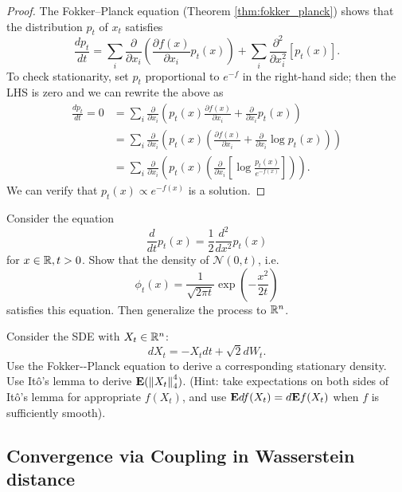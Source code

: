 \begin{proof}
The Fokker--Planck equation (Theorem \ref{thm:fokker_planck}) shows
that the distribution $p_{t}$ of $x_{t}$ satisfies 
\begin{equation}
\frac{dp_{t}}{dt}=\sum_{i}\frac{\partial}{\partial x_{i}}(\frac{\partial f(x)}{\partial x_{i}}p_{t}(x))+\sum_{i}\frac{\partial^{2}}{\partial x^{2}_{i}}\left[p_{t}(x)\right].\label{eq:dp_LD}
\end{equation}
To check stationarity, set $p_{t}$ proportional to $e^{-f}$ in the
right-hand side; then the LHS is zero and we can rewrite the above
as
\begin{align*}
\frac{dp_{t}}{dt}=0 & =\sum_{i}\frac{\partial}{\partial x_{i}}\left(p_{t}(x)\frac{\partial f(x)}{\partial x_{i}}+\frac{\partial}{\partial x_{i}}p_{t}(x)\right)\\
 & =\sum_{i}\frac{\partial}{\partial x_{i}}\left(p_{t}(x)\left(\frac{\partial f(x)}{\partial x_{i}}+\frac{\partial}{\partial x_{i}}\log p_{t}(x)\right)\right)\\
 & =\sum_{i}\frac{\partial}{\partial x_{i}}\left(p_{t}(x)\left(\frac{\partial}{\partial x_{i}}\left[\log\frac{p_{t}(x)}{e^{-f(x)}}\right]\right)\right).
\end{align*}
We can verify that $p_{t}(x)\propto e^{-f(x)}$ is a solution.
\end{proof}
\begin{xca}
Consider the equation 
\[
\frac{d}{dt}p_{t}(x)=\frac{1}{2}\frac{d^{2}}{dx^{2}}p_{t}(x)
\]
 for $x\in\mathbb{R},t>0$. Show that the density of $\mathcal{N}(0,t)$,
i.e. 
\[
\phi_{t}(x)=\frac{1}{\sqrt{2\pi t}}\exp\left(-\frac{x^{2}}{2t}\right)
\]
 satisfies this equation. Then generalize the process to $\mathbb{R}^{n}$.
\end{xca}

\begin{xca}
Consider the SDE with $X_{t}\in\mathbb{R}^{n}$: 
\[
dX_{t}=-X_{t}dt+\sqrt{2}dW_{t}.
\]
Use the Fokker-{}-Planck equation to derive a corresponding stationary
density. Use It\^{o}'s lemma to derive $\mathbf{E}(\left\Vert X_{t}\right\Vert^{4}_{4})$.
(Hint: take expectations on both sides of It\^{o}'s lemma for appropriate
$f(X_{t})$, and use $\mathbf{E} df(X_{t})=d\mathbf{E} f(X_{t})$ when $f$ is sufficiently
smooth). 
\end{xca}


\subsection{Convergence via Coupling in Wasserstein distance}

